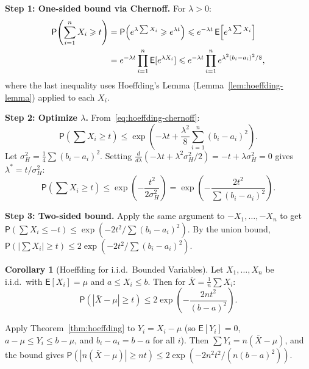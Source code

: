 \documentclass[12pt,a4paper]{article}
\makeatletter
\theoremstyle{definition}
\newtheorem{corollary}[theorem]{Corollary}
\renewenvironment{proof}[1][\proofname]{\par
  \pushQED{\qed}%
  \normalfont \topsep6\p@\@plus6\p@\relax
  \trivlist
  \item[\hskip\labelsep\bfseries #1\@addpunct{.}]\ignorespaces
}{%
  \popQED\endtrivlist\@endpefalse
}
\newcommand\expc{\mathsf{E}}
\newcommand\prb{\mathsf{P}}
\makeatother
\begin{document}
\begin{proof}
\textbf{Step 1: One-sided bound via Chernoff.} For $\lambda > 0$:
\begin{align}
\prb\!\left(\sum_{i=1}^n X_i \geqslant t\right) &= \prb\!\left(e^{\lambda\sum X_i} \geqslant e^{\lambda t}\right) \leqslant e^{-\lambda t}\,\expc\!\left[e^{\lambda\sum X_i}\right] \notag\\
&= e^{-\lambda t}\prod_{i=1}^n \expc[e^{\lambda X_i}] \leqslant e^{-\lambda t}\prod_{i=1}^n e^{\lambda^2(b_i - a_i)^2/8}, \label{eq:hoeffding-chernoff}
\end{align}
where the last inequality uses Hoeffding's Lemma (Lemma~\ref{lem:hoeffding-lemma}) applied to each $X_i$.

\textbf{Step 2: Optimize $\lambda$.} From~\eqref{eq:hoeffding-chernoff}:
\[
\prb\!\left(\sum X_i \geqslant t\right) \leqslant \exp\!\left(-\lambda t + \frac{\lambda^2}{8}\sum_{i=1}^n(b_i - a_i)^2\right).
\]
Let $\sigma_H^2 = \frac{1}{4}\sum(b_i - a_i)^2$. Setting $\frac{d}{d\lambda}(-\lambda t + \lambda^2\sigma_H^2/2) = -t + \lambda\sigma_H^2 = 0$ gives $\lambda^* = t/\sigma_H^2$:
\[
\prb\!\left(\sum X_i \geqslant t\right) \leqslant \exp\!\left(-\frac{t^2}{2\sigma_H^2}\right) = \exp\!\left(-\frac{2t^2}{\sum(b_i-a_i)^2}\right).
\]

\textbf{Step 3: Two-sided bound.} Apply the same argument to $-X_1, \ldots, -X_n$ to get $\prb(\sum X_i \leqslant -t) \leqslant \exp(-2t^2/\sum(b_i-a_i)^2)$. By the union bound, $\prb(|\sum X_i| \geqslant t) \leqslant 2\exp(-2t^2/\sum(b_i-a_i)^2)$.
\end{proof}

\begin{corollary}[Hoeffding for i.i.d.\ Bounded Variables]\label{cor:hoeffding-iid}
Let $X_1, \ldots, X_n$ be i.i.d.\ with $\expc[X_i] = \mu$ and $a \leqslant X_i \leqslant b$. Then for $\bar{X} = \frac{1}{n}\sum X_i$:
\begin{equation}\label{eq:hoeffding-mean}
\prb\!\left(|\bar{X} - \mu| \geqslant t\right) \leqslant 2\exp\!\left(-\frac{2nt^2}{(b-a)^2}\right).
\end{equation}
\end{corollary}

\begin{proof}
Apply Theorem~\ref{thm:hoeffding} to $Y_i = X_i - \mu$ (so $\expc[Y_i] = 0$, $a - \mu \leqslant Y_i \leqslant b - \mu$, and $b_i - a_i = b - a$ for all $i$). Then $\sum Y_i = n(\bar{X} - \mu)$, and the bound gives $\prb(|n(\bar{X}-\mu)| \geqslant nt) \leqslant 2\exp(-2n^2t^2/(n(b-a)^2))$.
\end{proof}
\end{document}
